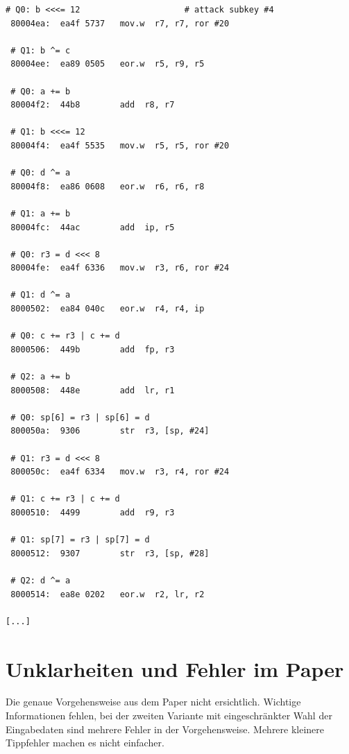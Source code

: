 \documentclass[a4paper,ngerman]{scrreprt}
\begin{document}
\begin{lstlisting}[caption={Assembler-Code, optimiert (-Os)}, label=lst:asm-optimized]
 # Q0: b <<<= 12                     # attack subkey #4
 80004ea:  ea4f 5737   mov.w  r7, r7, ror #20

 # Q1: b ^= c
 80004ee:  ea89 0505   eor.w  r5, r9, r5

 # Q0: a += b
 80004f2:  44b8        add  r8, r7

 # Q1: b <<<= 12
 80004f4:  ea4f 5535   mov.w  r5, r5, ror #20

 # Q0: d ^= a
 80004f8:  ea86 0608   eor.w  r6, r6, r8

 # Q1: a += b
 80004fc:  44ac        add  ip, r5

 # Q0: r3 = d <<< 8
 80004fe:  ea4f 6336   mov.w  r3, r6, ror #24

 # Q1: d ^= a
 8000502:  ea84 040c   eor.w  r4, r4, ip

 # Q0: c += r3 | c += d
 8000506:  449b        add  fp, r3

 # Q2: a += b
 8000508:  448e        add  lr, r1

 # Q0: sp[6] = r3 | sp[6] = d
 800050a:  9306        str  r3, [sp, #24]

 # Q1: r3 = d <<< 8
 800050c:  ea4f 6334   mov.w  r3, r4, ror #24

 # Q1: c += r3 | c += d
 8000510:  4499        add  r9, r3

 # Q1: sp[7] = r3 | sp[7] = d
 8000512:  9307        str  r3, [sp, #28]

 # Q2: d ^= a
 8000514:  ea8e 0202   eor.w  r2, lr, r2

[...]
\end{lstlisting}



\section{Unklarheiten und Fehler im Paper}

Die genaue Vorgehensweise aus dem Paper \cite{jungk_bhasin_2017} nicht
ersichtlich. Wichtige Informationen fehlen, bei der zweiten Variante mit
eingeschränkter Wahl der Eingabedaten sind mehrere Fehler in der Vorgehensweise.
Mehrere kleinere Tippfehler machen es nicht einfacher.
\end{document}
